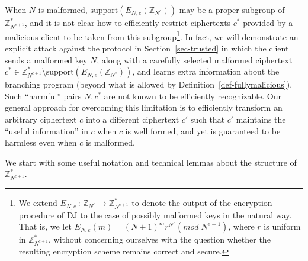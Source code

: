\documentclass[11pt]{article}
\newcommand{\encdj}{{E}_{N,e}}
\newcommand{\Z}{\mathbb{Z}}
\newcommand{\U}[1]{\mathbb{Z}_{#1}^*}
\newcommand\ot{\mbox{OT}\xspace}
\newcommand{\plain}{{{M}}}
\newcommand{\plaintext}[1]{\plain_{#1}}
\newcommand{\fnrngdom}[2]{#1\to#2}
\newcommand{\fndef}[3]{{#1\,:\,\fnrngdom{#2}{#3}}}
\newcommand{\support}{{\mathrm{support}}}
\begin{document}
When $N$ is malformed, $\support(\encdj(\Z_{N^e}))$ may be a proper
subgroup of $\U{N^{e+1}}$,
and it is not clear how to efficiently restrict ciphertexts $c^*$
provided by a malicious client to be taken from this subgroup\footnote{We extend $\fndef{E_{N,e}}{\Z_{N^e}}{\Z^*_{N^{e+1}}}$ to denote
the output of the encryption procedure of DJ to the case of possibly malformed keys in the natural way. That is, we let $E_{N,e}(m)=(N+1)^mr^{N^e}(mod\;N^{e+1})$,
where $r$ is uniform in $\Z^*_{N^{e+1}}$, without concerning ourselves with the question whether the resulting encryption scheme remains correct and secure.}. In
fact, we will demonstrate an explicit attack against the protocol
in Section~\ref{sec-trusted} in which the client sends a malformed
key $N$, along with a carefully selected malformed ciphertext
$c^*\in \U{N^{e+1}}\setminus \support(\encdj(\Z_{N^e}))$, and
learns extra information about the branching program (beyond what
is allowed by Definition~\ref{def-fullymalicious}). Such
``harmful'' pairs $N,c^*$ are not known to be efficiently
recognizable. Our general approach for overcoming this limitation
is to efficiently transform an arbitrary ciphertext $c$ into a
different ciphertext $c'$ such that $c'$ maintains the ``useful
information'' in $c$ when $c$ is well formed, and yet is guaranteed
to be harmless even when $c$ is malformed.

\medskip

We start with some useful notation and technical lemmas about the structure of
$\U{N^{e+1}}$.
\end{document}
